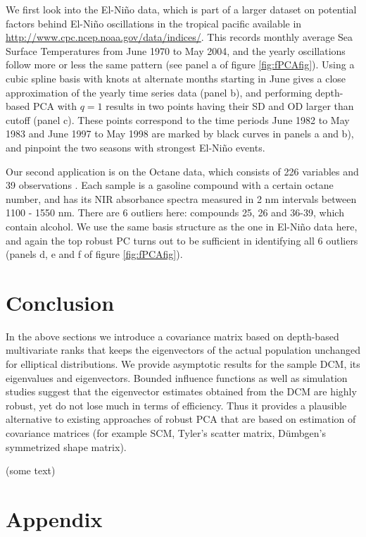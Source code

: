 \documentclass[fleqn,11pt]{article}
\begin{document}
We first look into the El-Ni\~no data, which is part of a larger dataset on potential factors behind El-Ni\~no oscillations in the tropical pacific available in \url{http://www.cpc.ncep.noaa.gov/data/indices/}. This records monthly average Sea Surface Temperatures from June 1970 to May 2004, and the yearly oscillations follow more or less the same pattern (see panel a of figure \ref{fig:fPCAfig}). Using a cubic spline basis with knots at alternate months starting in June gives a close approximation of the yearly time series data (panel b), and performing depth-based PCA with $q=1$ results in two points having their SD and OD larger than cutoff (panel c). These points correspond to the time periods June 1982 to May 1983 and June 1997 to May 1998 are marked by black curves in panels a and b), and pinpoint the two seasons with strongest El-Ni\~no events.

Our second application is on the Octane data, which consists of 226 variables and 39 observations \citep{esbensen94}. Each sample is a gasoline compound with a certain octane number, and has its NIR absorbance spectra measured in 2 nm intervals between 1100 - 1550 nm. There are 6 outliers here: compounds 25, 26 and 36-39, which contain alcohol. We use the same basis structure as the one in El-Ni\~no data here, and again the top robust PC turns out to be sufficient in identifying all 6 outliers (panels d, e and f of figure \ref{fig:fPCAfig}).

\section{Conclusion}\label{section:sec7}

In the above sections we introduce a covariance matrix based on depth-based multivariate ranks that keeps the eigenvectors of the actual population unchanged for elliptical distributions. We provide asymptotic results for the sample DCM, its eigenvalues and eigenvectors. Bounded influence functions as well as simulation studies suggest that the eigenvector estimates obtained from the DCM are highly robust, yet do not lose much in terms of efficiency. Thus it provides a plausible alternative to existing approaches of robust PCA that are based on estimation of covariance matrices (for example SCM, Tyler's scatter matrix, D\"{u}mbgen's symmetrized shape matrix).

{\colrbf (some text)}

\appendix
\section*{Appendix}
\end{document}
